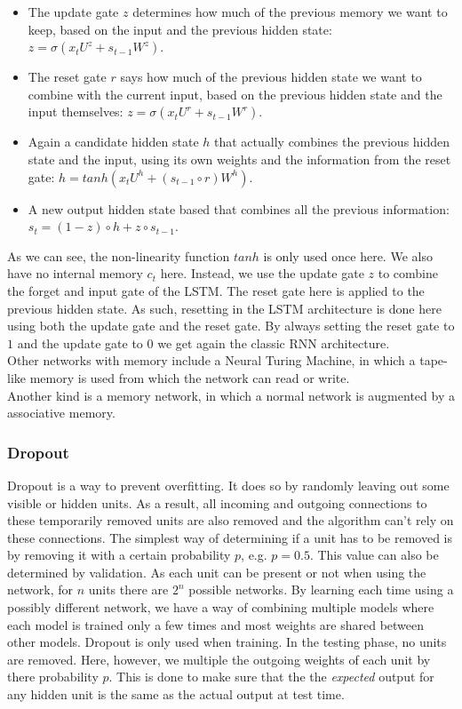 \documentclass[a4paper]{article}
\begin{document}
\begin{itemize}
\item The update gate $z$ determines how much of the previous memory we want to keep, based on the input and the previous hidden state: $z = \sigma (x_tU^z + s_{t-1}W^z)$.
\item The reset gate $r$ says how much of the previous hidden state we want to combine with the current input, based on the previous hidden state and the input themselves: $z = \sigma (x_tU^r + s_{t-1}W^r)$.
\item Again a candidate hidden state $h$ that actually combines the previous hidden state and the input, using its own weights and the information from the reset gate: $h = tanh(x_tU^h + (s_{t-1} \circ r)W^h)$.
\item A new output hidden state based that combines all the previous information: $s_t = (1-z) \circ h + z \circ s_{t-1}$.
\end{itemize}
As we can see, the non-linearity function $tanh$ is only used once here. We also have no internal memory $c_t$ here. Instead, we use the update gate $z$ to combine the forget and input gate of the LSTM. The reset gate here is applied to the previous hidden state. As such, resetting in the LSTM architecture is done here using both the update gate and the reset gate. By always setting the reset gate to $1$ and the update gate to $0$ we get again the classic RNN architecture.\\

Other networks with memory include a Neural Turing Machine, in which a tape-like memory is used from which the network can read or write.\\
Another kind is a memory network, in which a normal network is augmented by a associative memory.\\

\subsubsection{Dropout}
Dropout is a way to prevent overfitting. It does so by randomly leaving out some visible or hidden units. As a result, all incoming and outgoing connections to these temporarily removed units are also removed and the algorithm can't rely on these connections. The simplest way of determining if a unit has to be removed is by removing it with a certain probability $p$, e.g. $p=0.5$. This value can also be determined by validation. As each unit can be present or not when using the network, for $n$ units there are $2^n$ possible networks. By learning each time using a possibly different network, we have a way of combining multiple models where each model is trained only a few times and most weights are shared between other models. Dropout is only used when training. In the testing phase, no units are removed. Here, however, we multiple the outgoing weights of each unit by there probability $p$.
This is done to make sure that the the \textit{expected} output for any hidden unit is the same as the actual output at test time.
\end{document}
